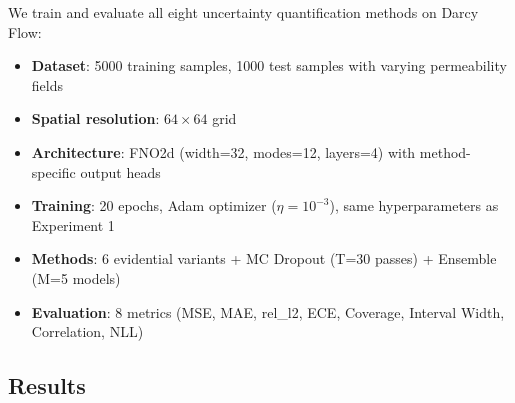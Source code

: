 We train and evaluate all eight uncertainty quantification methods on Darcy Flow:
\begin{itemize}
\item \textbf{Dataset}: 5000 training samples, 1000 test samples with varying permeability fields
\item \textbf{Spatial resolution}: $64 \times 64$ grid
\item \textbf{Architecture}: FNO2d (width=32, modes=12, layers=4) with method-specific output heads
\item \textbf{Training}: 20 epochs, Adam optimizer ($\eta = 10^{-3}$), same hyperparameters as Experiment 1
\item \textbf{Methods}: 6 evidential variants + MC Dropout (T=30 passes) + Ensemble (M=5 models)
\item \textbf{Evaluation}: 8 metrics (MSE, MAE, rel\_l2, ECE, Coverage, Interval Width, Correlation, NLL)
\end{itemize}

\subsection{Results}

